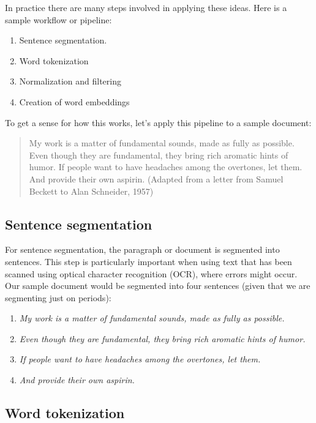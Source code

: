 In practice there are many steps involved in applying these ideas. Here is a sample workflow or pipeline:
\begin{enumerate}
\item Sentence segmentation.
\item Word tokenization
\item Normalization and filtering
\item Creation of word embeddings
\end{enumerate}

To get a sense for how this works, let's apply this pipeline to a sample document:

\begin{quote}
My work is a matter of fundamental sounds, made as fully as possible. Even though they are fundamental, they bring rich aromatic hints of humor. If people want to have headaches among the overtones, let them. And provide their own aspirin. (Adapted from a letter from Samuel Beckett to Alan Schneider, 1957)
\end{quote}

\subsection{Sentence segmentation} 

For sentence segmentation, the paragraph or document is segmented into sentences. This step is particularly important when using text that has been scanned using optical character recognition (OCR), where errors might occur. Our sample document would be segmented into four sentences (given that we are segmenting just on periods):

\begin{enumerate}
    \item \textit{My work is a matter of fundamental sounds, made as fully as possible.}
    \item \textit{Even though they are fundamental, they bring rich aromatic hints of humor.}
    \item \textit{If people want to have headaches among the overtones, let them.}
    \item \textit{And provide their own aspirin.}
\end{enumerate}

\subsection{Word tokenization} 


